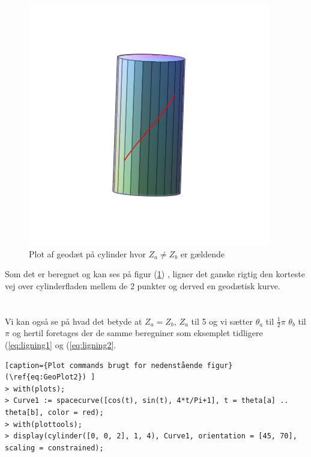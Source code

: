 \begin{figure}
\center
\includegraphics[scale=0.4]{pictures/Opg8_figur1.png}  
\caption{Plot af geodæt på cylinder hvor $Z_a\neq Z_b$ er gældende }
\label{eq:GeoPlot1}
\end{figure}
Som det er beregnet og kan ses på figur  (\ref{eq:GeoPlot1}) , ligner det ganske rigtig den korteste vej over cylinderfladen mellem de 2 punkter og derved en geodætisk kurve.
\\
\\
\\
Vi kan også se på hvad det betyde at $Z_a=Z_b$, $Z_a$ til 5 og vi sætter $\theta_a$ til $\frac{1}{2}\pi$ $\theta_b$ til $\pi$ og hertil foretages der de samme beregniner som eksemplet tidligere (\ref{eq:ligning1} og (\ref{eq:ligning2}.
\begin{lstlisting}[caption={Plot commands brugt for nedenstående figur}(\ref{eq:GeoPlot2}) ]
> with(plots);
> Curve1 := spacecurve([cos(t), sin(t), 4*t/Pi+1], t = theta[a] .. theta[b], color = red);
> with(plottools);
> display(cylinder([0, 0, 2], 1, 4), Curve1, orientation = [45, 70], scaling = constrained);

\end{lstlisting}
